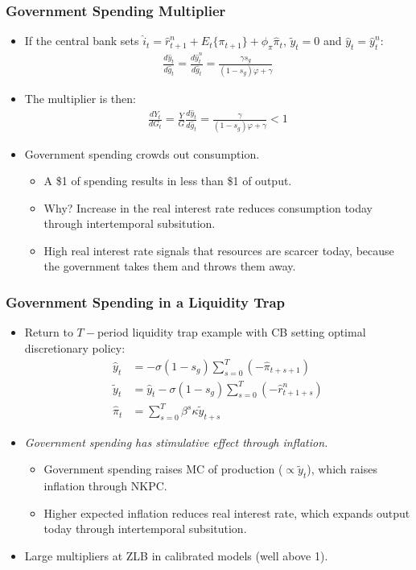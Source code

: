 \documentclass[english,xcolor=svgnames]{beamer}
\begin{document}
\begin{frame}
\frametitle{Government Spending Multiplier}
\begin{itemize}
	\item If the central bank sets $\hat{i}_t=\hat{r}_{t+1}^n+E_t\{\pi_{t+1}\}+\phi_{\pi}\hat{\pi}_t$, $\tilde{y}_t=0$ and $\hat{y}_t=\hat{y}_t^n$:
	\begin{align*}
		\frac{d\hat{y}_t}{d\hat{g}_t}=\frac{d\hat{y}_t^n}{d\hat{g}_t}=\frac{\gamma s_g}{(1-s_g)\varphi+\gamma}
	\end{align*}
	\item The multiplier is then:
	\begin{align*}
		\frac{dY_t}{dG_t}=\frac{Y}{G}\frac{d\hat{y}_t}{d\hat{g}_t}=\frac{\gamma}{(1-s_g)\varphi+\gamma}<1
	\end{align*}
	\item Government spending crowds out consumption.
	\begin{itemize}
		\item A \$1 of spending results in less than \$1 of output.
		\item Why? Increase in the real interest rate reduces consumption today through intertemporal subsitution.
		\item High real interest rate signals that resources are scarcer today, because the government takes them and throws them away.
	\end{itemize}
\end{itemize}
\end{frame}


\begin{frame}
\frametitle{Government Spending in a Liquidity Trap}
\begin{itemize}
	\item Return to $T-$period liquidity trap example with CB setting optimal discretionary policy:
	\begin{align*}
		\hat{y}_t &= -\sigma(1-s_g) \sum_{s=0}^{T}(-\hat{\pi}_{t+s+1}) \\
		\tilde{y}_t &= \hat{y}_t -\sigma(1-s_g) \sum_{s=0}^{T}(-\hat{r}_{t+1+s}^n) \\
		\hat{\pi}_t&=\sum_{s=0}^{T}\beta^s \kappa \tilde{y}_{t+s}
	\end{align*}
	\item \emph{Government spending has stimulative effect through inflation.}
	\begin{itemize}
		\item Government spending raises MC of production ($\propto \tilde{y}_t$), which raises inflation through NKPC.
		\item Higher expected inflation reduces real interest rate, which expands output today through intertemporal subsitution.
	\end{itemize}
	\item Large multipliers at ZLB in calibrated models (well above 1).
\end{itemize}
\end{frame}
\end{document}
